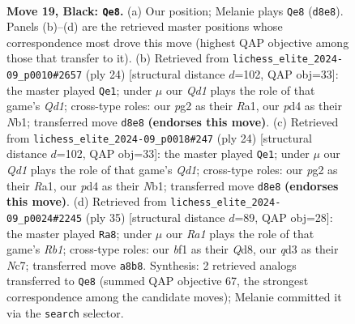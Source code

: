 \documentclass[11pt]{article}
\begin{document}
\clearpage

\begin{figure}[p]\centering
\begin{subfigure}{0.46\textwidth}\centering
\resizebox{\linewidth}{!}{%
\newchessgame
\chessboard[
  setfen={r1bq1rk1/1p1n3p/n1p1p3/p2p1p2/3P1P2/2NQ1N2/PPP2KPP/1R3B1R b - - 1 19},
  showmover=false,
  pgfstyle=straightmove, color=movearrow, markmove={d8-e8}
]}
\caption{}
\end{subfigure}\hfill
\begin{subfigure}{0.46\textwidth}\centering
\resizebox{\linewidth}{!}{%
\newchessgame
\chessboard[
  setfen={r2q1rk1/1pp2pp1/2n1b2p/p2np3/8/2PPPN1P/PPB3P1/RN1Q1RK1 w - - 0 13},
  showmover=false,
  pgfstyle=straightmove, color=movearrow, markmove={d1-e1}
]}
\caption{}
\end{subfigure}
\\[4pt]
\begin{subfigure}{0.46\textwidth}\centering
\resizebox{\linewidth}{!}{%
\newchessgame
\chessboard[
  setfen={r2q1rk1/1pp2pp1/2n1b2p/p2np3/8/2PPPN1P/PPB3P1/RN1Q1RK1 w - - 0 13},
  showmover=false,
  pgfstyle=straightmove, color=movearrow, markmove={d1-e1}
]}
\caption{}
\end{subfigure}\hfill
\begin{subfigure}{0.46\textwidth}\centering
\resizebox{\linewidth}{!}{%
\newchessgame
\chessboard[
  setfen={1r1q1rk1/2n1p1bp/3p1np1/2pP4/1p3N1P/6P1/1PP1NP2/R1BQR1K1 b - - 1 18},
  showmover=false,
  pgfstyle=straightmove, color=movearrow, markmove={b8-a8}
]}
\caption{}
\end{subfigure}
\caption{\textbf{Move 19, Black: \texttt{Qe8}.} (a) Our position; Melanie plays \texttt{Qe8} (\texttt{d8e8}). Panels (b)--(d) are the retrieved master positions whose correspondence most drove this move (highest QAP objective among those that transfer to it). (b) Retrieved from \texttt{lichess\_elite\_2024-09\_p0010\#2657} (ply 24) [structural distance $d$=102, QAP obj=33]: the master played \texttt{Qe1}; under $\mu$ our \emph{Qd1} plays the role of that game's \emph{Qd1}; cross-type roles: our \emph{p}g2 as their \emph{R}a1, our \emph{p}d4 as their \emph{N}b1; transferred move \texttt{d8e8} \textbf{(endorses this move)}. (c) Retrieved from \texttt{lichess\_elite\_2024-09\_p0018\#247} (ply 24) [structural distance $d$=102, QAP obj=33]: the master played \texttt{Qe1}; under $\mu$ our \emph{Qd1} plays the role of that game's \emph{Qd1}; cross-type roles: our \emph{p}g2 as their \emph{R}a1, our \emph{p}d4 as their \emph{N}b1; transferred move \texttt{d8e8} \textbf{(endorses this move)}. (d) Retrieved from \texttt{lichess\_elite\_2024-09\_p0024\#2245} (ply 35) [structural distance $d$=89, QAP obj=28]: the master played \texttt{Ra8}; under $\mu$ our \emph{Ra1} plays the role of that game's \emph{Rb1}; cross-type roles: our \emph{b}f1 as their \emph{Q}d8, our \emph{q}d3 as their \emph{N}c7; transferred move \texttt{a8b8}. Synthesis: 2 retrieved analogs transferred to \texttt{Qe8} (summed QAP objective 67, the strongest correspondence among the candidate moves); Melanie committed it via the \texttt{search} selector.}
\label{fig:thought-m37}
\end{figure}
\end{document}
